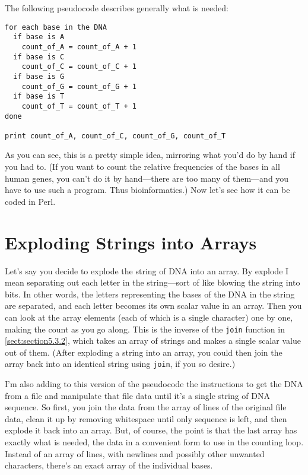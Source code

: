 The following pseudocode describes generally what is needed:

\begin{lstlisting}
for each base in the DNA
  if base is A
    count_of_A = count_of_A + 1
  if base is C
    count_of_C = count_of_C + 1
  if base is G
    count_of_G = count_of_G + 1
  if base is T
    count_of_T = count_of_T + 1
done

print count_of_A, count_of_C, count_of_G, count_of_T
\end{lstlisting}

As you can see, this is a pretty simple idea, mirroring what you'd do by hand if you had to. (If you want to count the relative frequencies of the bases in all human genes, you can't do it by hand—there are too many of them—and you have to use such a program. Thus bioinformatics.) Now let's see how it can be coded in Perl. 

\section{Exploding Strings into Arrays}
Let's say you decide to explode the string of DNA into an array. By explode I mean separating out each letter in the string—sort of like blowing the string into bits. In other words, the letters representing the bases of the DNA in the string are separated, and each letter becomes its own scalar value in an array. Then you can look at the array elements (each of which is a single character) one by one, making the count as you go along. This is the inverse of the \verb|join| function in \autoref{sect:section5.3.2}, which takes an array of strings and makes a single scalar value out of them. (After exploding a string into an array, you could then join the array back into an identical string using \verb|join|, if you so desire.)

I'm also adding to this version of the pseudocode the instructions to get the DNA from a file and manipulate that file data until it's a single string of DNA sequence. So first, you join the data from the array of lines of the original file data, clean it up by removing whitespace until only sequence is left, and then explode it back into an array. But, of course, the point is that the last array has exactly what is needed, the data in a convenient form to use in the counting loop. Instead of an array of lines, with newlines and possibly other unwanted characters, there's an exact array of the individual bases. 

